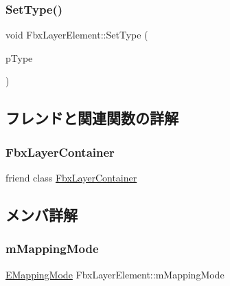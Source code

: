 \subsubsection{\texorpdfstring{Set\+Type()}{SetType()}}
{\footnotesize\ttfamily void Fbx\+Layer\+Element\+::\+Set\+Type (\begin{DoxyParamCaption}\item[{const \hyperlink{class_fbx_data_type}{Fbx\+Data\+Type} $\ast$}]{p\+Type }\end{DoxyParamCaption})}



\subsection{フレンドと関連関数の詳解}
\mbox{\label{class_fbx_layer_element_a791d2046ce60bf6f5fb85d9dc6242f2e}} 
\subsubsection{\texorpdfstring{Fbx\+Layer\+Container}{FbxLayerContainer}}
{\footnotesize\ttfamily friend class \hyperlink{class_fbx_layer_container}{Fbx\+Layer\+Container}\hspace{0.3cm}{\ttfamily [friend]}}



\subsection{メンバ詳解}
\mbox{\label{class_fbx_layer_element_a3fb1be862396ae7716fe2a1935197ef4}} 
\subsubsection{\texorpdfstring{m\+Mapping\+Mode}{mMappingMode}}
{\footnotesize\ttfamily \hyperlink{class_fbx_layer_element_a5a40e95db30ae9f94611dc3f1568af26}{E\+Mapping\+Mode} Fbx\+Layer\+Element\+::m\+Mapping\+Mode\hspace{0.3cm}{\ttfamily [protected]}}


